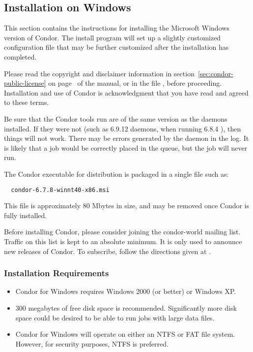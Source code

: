 \subsection{\label{sec:Windows-Install}Installation on Windows}

This section contains the instructions for installing the Microsoft
Windows version of Condor.  
The install program will set up a slightly customized configuration
file that may be further customized after the installation has completed.

Please read the copyright and disclaimer information in 
section~\ref{sec:condor-public-license} on
page~\pageref{sec:condor-public-license} of the manual, or in the
file 
, before proceeding.  Installation and
use of Condor is acknowledgment that you have read and agreed to these
terms.

Be sure that the Condor tools run are of the same version
as the daemons installed.
If they were not (such as 6.9.12 daemons, when running 6.8.4 ),
then things will not work.
There may be errors generated by the  daemon in the log.
It is likely that a job would be correctly placed in the queue,
but the job will never run.

The Condor executable for distribution is packaged in
a single file such as:
\begin{verbatim}
  condor-6.7.8-winnt40-x86.msi
\end{verbatim}

This file is approximately 80 Mbytes in size, and may be
removed once Condor is fully installed.

Before installing Condor, please consider joining the condor-world mailing
list.  Traffic on this list is kept to an absolute minimum.  It is only
used to announce new releases of Condor.
To subscribe, follow the directions given at
.

\subsubsection{Installation Requirements}

\begin{itemize}

\item Condor for Windows requires Windows 2000 (or better) or Windows XP.

\item 300 megabytes of free disk space is recommended.  Significantly more 
disk space could be desired to be able to run jobs with large data files.

\item Condor for Windows will operate on either an NTFS or FAT file system.  However, for security purposes, NTFS is preferred.

\end{itemize}

